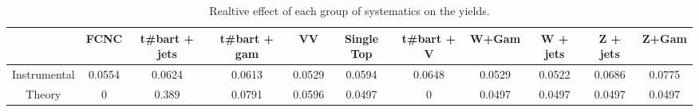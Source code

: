 \begin{table}[htbp]
\begin{center}
\begin{tabular}{|c|c|c|c|c|c|c|c|c|c|c|}
\hline 
      & FCNC      & t#bar{t} + jets      & t#bar{t} +  gam      & VV      & Single Top      & t#bar{t} + V      & W+Gam      & W + jets      & Z + jets      & Z+Gam \\ 
\hline 
 Instrumental & 0.0554 & 0.0624 & 0.0613 & 0.0529 & 0.0594 & 0.0648 & 0.0529 & 0.0522 & 0.0686 & 0.0775 \\ 
 Theory & 0 & 0.389 & 0.0791 & 0.0596 & 0.0497 & 0 & 0.0497 & 0.0497 & 0.0497 & 0.0497 \\ 
\hline 
\end{tabular} 
\caption{Realtive effect of each group of systematics on the yields.} 
\end{center} 
\end{table} 
